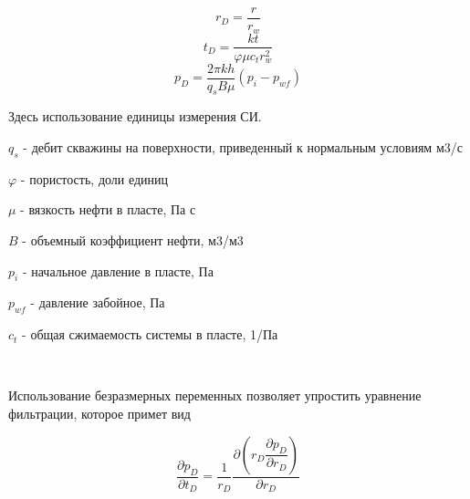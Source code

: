 
$$ r_D = \frac{r}{r_w} $$
$$ t_D = \frac{kt}{\varphi \mu c_t r_w^2}$$
$$ p_D = \frac{2 \pi kh}{q_s B \mu} \left( p_i - p_{wf} \right) $$

Здесь использование единицы измерения СИ. 

$q_s$ - дебит скважины на поверхности, приведенный к нормальным условиям м3/с

$\varphi$ - пористость, доли единиц

$\mu$ - вязкость нефти в пласте, Па с

$B$ - объемный коэффициент нефти, м3/м3

$p_i$ - начальное давление в пласте, Па

$p_{wf}$ - давление забойное, Па

$c_t$ - общая сжимаемость системы в пласте, 1/Па

\

Использование безразмерных переменных позволяет упростить уравнение фильтрации, которое примет вид

$$ \frac{\partial p_D}{ \partial t_D} = \frac{1}{r_D} \frac{ \partial{ \left( r_D \dfrac{\partial p_D}{ \partial r_D} \right) } }{ \partial{r_D} } $$

